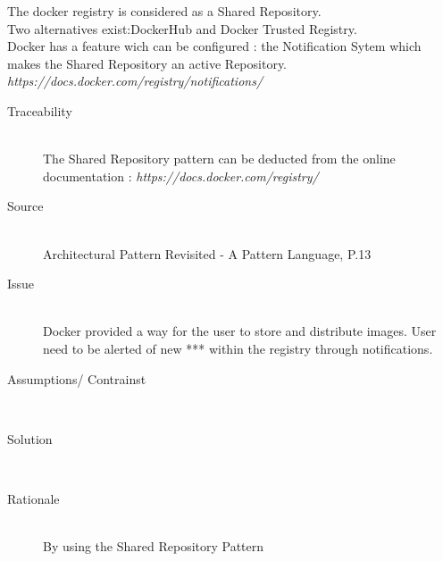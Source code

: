 The docker registry is considered as a Shared Repository. \\
Two alternatives exist:DockerHub and Docker Trusted Registry. \\

Docker has a feature wich can be configured : the Notification Sytem which makes the Shared Repository an active Repository.
\textit{https://docs.docker.com/registry/notifications/}

\begin{description}
\item[Traceability]~\\
The Shared Repository pattern can be deducted from the online documentation : \textit{https://docs.docker.com/registry/}

\item[Source]~\\
Architectural Pattern Revisited - A Pattern Language, P.13 \cite{avgeriou2005architectural}

\item[Issue]~\\
Docker provided a way for the user to store and distribute images.
User need to be alerted of new *** within the registry through notifications. %

\item[Assumptions/ Contrainst]~\\

\item[Solution]~\\

\item[Rationale]~\\ %
By using the Shared Repository Pattern 


\end{description}


